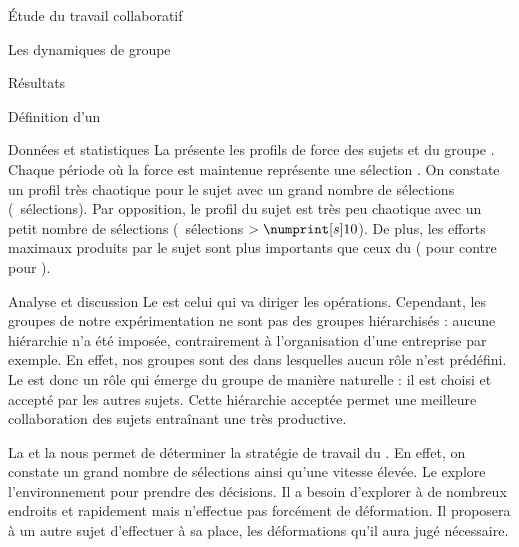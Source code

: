 \documentclass[myfrancais]{mythesis}
\begin{document}
\begin{mypart}{Étude du travail collaboratif}
\begin{mychapter}{Les dynamiques de groupe}
\begin{mysection}{Résultats}
\begin{mysubsection}{Définition d'un }
\begin{mysubsubsection}{Données et statistiques}
						La  présente les profils de force  des sujets  et  du groupe .
						Chaque période où la force est maintenue représente une sélection .
						On constate un profil très chaotique pour le sujet  avec un grand nombre de sélections (~sélections).
						Par opposition, le profil du sujet  est très peu chaotique avec un petit nombre de sélections (~sélections $> \mynum[s]{10}$).
						De plus, les efforts maximaux produits par le sujet  sont plus importants que ceux du  ( pour  contre  pour ).
					\end{mysubsubsection}
					\begin{mysubsubsection}{Analyse et discussion}
						Le  est celui qui va diriger les opérations.
						Cependant, les groupes de notre expérimentation ne sont pas des groupes hiérarchisés : aucune hiérarchie n'a été imposée, contrairement à l'organisation d'une entreprise par exemple.
						En effet, nos groupes sont des  dans lesquelles aucun rôle n'est prédéfini.
						Le  est donc un rôle qui émerge du groupe de manière naturelle : il est choisi et accepté par les autres sujets.
						Cette hiérarchie acceptée permet une meilleure collaboration des sujets entraînant une  très productive.

						La  et la  nous permet de déterminer la stratégie de travail du .
						En effet, on constate un grand nombre de sélections ainsi qu'une vitesse élevée.
						Le  explore l'environnement pour prendre des décisions.
						Il a besoin d'explorer à de nombreux endroits et rapidement mais n'effectue pas forcément de déformation.
						Il proposera à un autre sujet d'effectuer à sa place, les déformations qu'il aura jugé nécessaire.


\end{mysubsubsection}
\end{mysubsection}
\end{mysection}
\end{mychapter}
\end{mypart}
\end{document}
